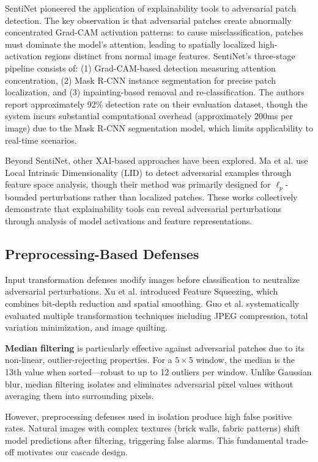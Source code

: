 \documentclass[conference]{IEEEtran}
\begin{document}
SentiNet \cite{chou2020sentinet} pioneered the application of explainability tools to adversarial patch detection. The key observation is that adversarial patches create abnormally concentrated Grad-CAM activation patterns: to cause misclassification, patches must dominate the model's attention, leading to spatially localized high-activation regions distinct from normal image features. SentiNet's three-stage pipeline consists of: (1) Grad-CAM-based detection measuring attention concentration, (2) Mask R-CNN instance segmentation for precise patch localization, and (3) inpainting-based removal and re-classification. The authors report approximately 92\% detection rate on their evaluation dataset, though the system incurs substantial computational overhead (approximately 200ms per image) due to the Mask R-CNN segmentation model, which limits applicability to real-time scenarios.

Beyond SentiNet, other XAI-based approaches have been explored. Ma et al. \cite{ma2018characterizing} use Local Intrinsic Dimensionality (LID) to detect adversarial examples through feature space analysis, though their method was primarily designed for $\ell_p$-bounded perturbations rather than localized patches. These works collectively demonstrate that explainability tools can reveal adversarial perturbations through analysis of model activations and feature representations.

\subsection{Preprocessing-Based Defenses}

Input transformation defenses modify images before classification to neutralize adversarial perturbations. Xu et al. \cite{xu2017feature} introduced Feature Squeezing, which combines bit-depth reduction and spatial smoothing. Guo et al. \cite{guo2017countering} systematically evaluated multiple transformation techniques including JPEG compression, total variation minimization, and image quilting.

\textbf{Median filtering} is particularly effective against adversarial patches due to its non-linear, outlier-rejecting properties. For a $5\times5$ window, the median is the 13th value when sorted---robust to up to 12 outliers per window. Unlike Gaussian blur, median filtering isolates and eliminates adversarial pixel values without averaging them into surrounding pixels.

However, preprocessing defenses used in isolation produce high false positive rates. Natural images with complex textures (brick walls, fabric patterns) shift model predictions after filtering, triggering false alarms. This fundamental trade-off motivates our cascade design.
\end{document}
